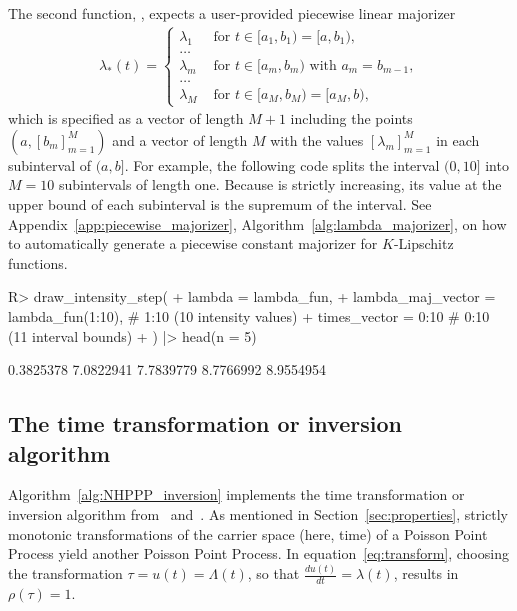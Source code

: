 \documentclass[article]{jss}\usepackage[]{graphicx}\usepackage[]{xcolor}
\newcommand{\der}[2]{\frac{d {#1}} {d{#2}}}
\newcommand{\fct}[1]{\code{#1()}}
\begin{document}
The second function, \fct{draw\_intensity\_step}, expects a user-provided piecewise linear majorizer
\begin{align*}
    \lambda_*(t) = \begin{cases}
    \lambda_1 &\textrm{ for } t \in [a_1, b_1) = [a, b_1), \\
    \dots &\\
    \lambda_m &\textrm{ for } t \in [a_m, b_m) \textrm{ with } a_{m} = b_{m-1}, \\
    \dots &\\
    \lambda_M &\textrm{ for } t \in [a_M, b_M) = [a_M, b),
    \end{cases}
\end{align*}
which is specified as a vector of length $M+1$ including the points $(a, [b_m]_{m=1}^M)$ and a vector of length $M$ with the values $[\lambda_m]_{m=1}^M$ in each subinterval of $(a, b]$. For example, the following code splits the interval $(0, 10]$ into $M=10$ subintervals of length one. Because \fct{lambda\_fun} is strictly increasing, its value at the upper bound of each subinterval is the supremum of the interval. See Appendix~\ref{app:piecewise_majorizer}, Algorithm~\ref{alg:lambda_majorizer}, on how to automatically generate a piecewise constant majorizer for $K$-Lipschitz functions.


\begin{Schunk}
\begin{Sinput}
R> draw_intensity_step(
+    lambda = lambda_fun,
+    lambda_maj_vector = lambda_fun(1:10), # 1:10 (10 intensity values)
+    times_vector = 0:10 # 0:10 (11 interval bounds)
+  ) |> head(n = 5)
\end{Sinput}
\begin{Soutput}
[1] 0.3825378 7.0822941 7.7839779 8.7766992 8.9554954
\end{Soutput}
\end{Schunk}

\subsection{The time transformation or inversion algorithm}\label{sec:inversion}
Algorithm~\ref{alg:NHPPP_inversion} implements the time transformation or inversion algorithm from~\citet{Cinlar1975inversion} and~\citet[par. 4.2]{cox1965theory}. As mentioned in Section~\ref{sec:properties}, strictly monotonic transformations of the carrier space (here, time) of a Poisson Point Process yield another Poisson Point Process. In equation~\eqref{eq:transform}, choosing the transformation $\tau = u(t) = \Lambda(t)$, so that $\der{u(t)}{t} = \lambda(t)$, results in $\rho(\tau) = 1$.
\end{document}
